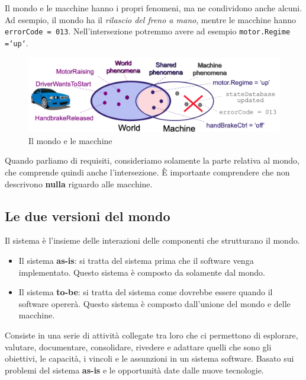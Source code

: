 Il mondo e le macchine hanno i propri fenomeni, ma ne condividono 
anche alcuni. Ad esempio, il mondo ha il \textit{rilascio del freno a mano},
mentre le macchine hanno \texttt{errorCode = 013}. Nell'intersezione 
potremmo avere ad esempio \texttt{motor.Regime =`up`}.
\begin{figure}[H]
    \centering
    \includegraphics[scale=0.3]{img/worldmod.png}
    \caption{Il mondo e le macchine}
    \label{fig:req_eng}
\end{figure}
\begin{tcolorbox}[colback=green!5!white,colframe=green!75!black]
    Quando parliamo di requisiti, consideriamo solamente la parte 
    relativa al mondo, che comprende quindi anche l'intersezione.
    È importante comprendere che non descrivono \textbf{nulla}
    riguardo alle macchine.
\end{tcolorbox}
\subsection{Le due versioni del mondo}
Il sistema è l'insieme delle interazioni delle componenti che 
strutturano il mondo.
\begin{itemize}
    \item Il sistema \textbf{as-is}: si tratta del sistema prima che 
    il software venga implementato. Questo sistema è composto da
    solamente dal mondo.
    \item Il sistema \textbf{to-be}: si tratta del sistema come 
    dovrebbe essere quando il software opererà. Questo sistema
    è composto dall'unione del mondo e delle macchine.
\end{itemize}
\begin{tcolorbox}[title=Definizione preliminare dell'ingegneria dei requisiti,
colback=blue!5!white,colframe=blue!75!black]
    Consiste in una serie di attività collegate tra loro che ci permettono 
    di esplorare, valutare, documentare, consolidare, rivedere e adattare 
    quelli che sono gli obiettivi, le capacità, i vincoli e le assunzioni 
    in un sistema software. Basato sui problemi del sistema \textbf{as-is}
    e le opportunità date dalle nuove tecnologie.
\end{tcolorbox}

